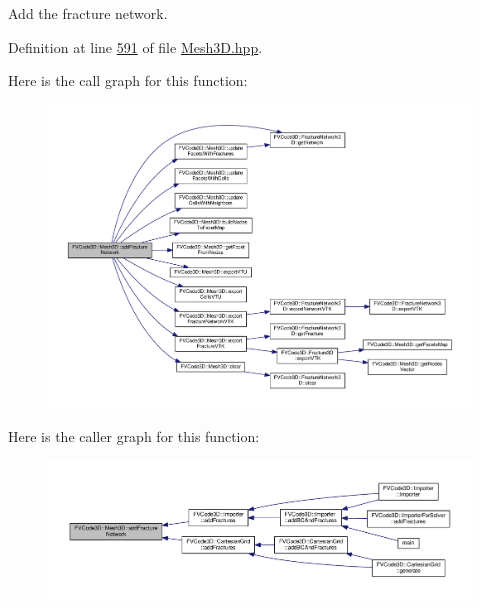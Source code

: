 Add the fracture network. 



Definition at line \hyperlink{Mesh3D_8hpp_source_l00591}{591} of file \hyperlink{Mesh3D_8hpp_source}{Mesh3\+D.\+hpp}.



Here is the call graph for this function\+:
\nopagebreak
\begin{figure}[H]
\begin{center}
\leavevmode
\includegraphics[width=350pt]{classFVCode3D_1_1Mesh3D_a269c01796091da2f599e66b6b91b39dd_cgraph}
\end{center}
\end{figure}




Here is the caller graph for this function\+:
\nopagebreak
\begin{figure}[H]
\begin{center}
\leavevmode
\includegraphics[width=350pt]{classFVCode3D_1_1Mesh3D_a269c01796091da2f599e66b6b91b39dd_icgraph}
\end{center}
\end{figure}



